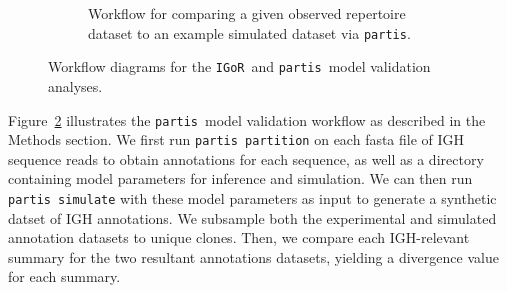 \documentclass{article}
\newcommand{\partis}{\texttt{partis}}
\newcommand{\igor}{\texttt{IGoR}}
\begin{document}
\begin{figure}
\begin{subfigure}{0.5\textwidth}
\begin{adjustbox}{max totalsize={\textwidth}{.5\textheight},center}
    \end{adjustbox}
    \caption{Workflow for comparing a given observed repertoire dataset to an example simulated dataset via \partis.}
    \label{fig:PartisWorkflow}
    \end{subfigure}
    \caption{Workflow diagrams for the \igor\ and \partis\ model validation analyses.}
\end{figure}
Figure~\ref{fig:PartisWorkflow} illustrates the \partis\ model validation workflow as described in the Methods section.
We first run \texttt{partis partition} on each fasta file of IGH sequence reads to obtain annotations for each sequence, as well as a directory containing model parameters for inference and simulation.
We can then run \texttt{partis simulate} with these model parameters as input to generate a synthetic datset of IGH annotations.
We subsample both the experimental and simulated annotation datasets to unique clones.
Then, we compare each IGH-relevant summary for the two resultant annotations datasets, yielding a divergence value for each summary.
\end{document}
